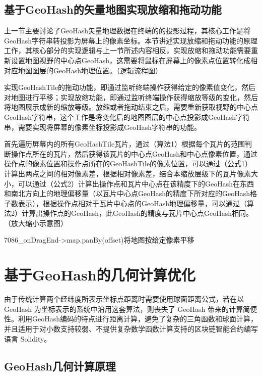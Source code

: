 
\subsection{基于GeoHash的矢量地图实现放缩和拖动功能}

上一节主要讨论了GeoHash矢量地理数据在终端的的投影过程，其核心工作是将GeoHash字符串转投影为屏幕上的像素坐标。本节讲述实现放缩和拖动功能的原理工作，其核心部分的实现逻辑与上一节所述内容相反，实现放缩和拖动功能需要重新设置地图视野的中心点GeoHash，这需要将鼠标在屏幕上的像素点位置转化成相对应地图图层的GeoHash地理位置。（逻辑流程图）

实现GeoHashTile的拖动功能，即通过监听终端操作获得给定的像素值变化，然后对地图进行平移；实现放缩功能，即通过监听终端操作获得缩放等级的变化，然后将地图展示成新的缩放等级。放缩或者拖动结束之后，需要重新获取视野的中心点GeoHash字符串，这个工作是将变化后的地图图层的中心点投影成GeoHash字符串，需要实现将屏幕的像素坐标投影成GeoHash字符串的功能。

首先遍历屏幕内的所有GeoHashTile瓦片，通过（算法1）根据每个瓦片的范围判断操作点所在的瓦片，然后获得该瓦片的中心点GeoHash和中心点像素位置，通过操作点的像素位置和操作点所在的GeoHashTile的像素位置，可以通过（公式1）计算出两点之间的相对像素差，根据相对像素差，结合本缩放层级下的瓦片像素大小，可以通过（公式2）计算出操作点和瓦片中心点在该精度下的GeoHash在东西和南北方向上的地理偏移量（以瓦片中心点GeoHash的精度下所对应的GeoHash格子数表示），根据操作点相对于瓦片中心点的GeoHash地理偏移量，可以通过（算法2）计算出操作点的GeoHash，此GeoHash的精度与瓦片中心点GeoHash相同。（放大缩小示意图）

7086_onDragEnd->map.panBy(offset)将地图按给定像素平移

\section{基于GeoHash的几何计算优化}
由于传统计算两个经纬度所表示坐标点距离时需要使用球面距离公式，若在以 GeoHash 为坐标表示的系统中沿用这套算法，则丧失了 GeoHash 带来的计算简便性。利用GeoHash编码的特点进行距离计算，避免了复杂的三角函数和球面计算，并且适用于对小数支持较弱、不提供复杂数学函数计算支持的区块链智能合约编写语言 Solidity。

\subsection{GeoHash几何计算原理}

